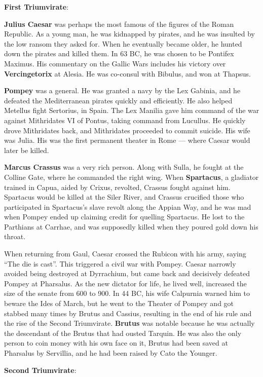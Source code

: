 \textbf{First Triumvirate}:

\textbf{Julius Caesar} was perhaps the most famous of the figures of the Roman Republic.
As a young man, he was kidnapped by pirates, and he was insulted by the low ransom they asked for.
When he eventually became older, he hunted down the pirates and killed them.
In 63 BC, he was chosen to be Pontifex Maximus.
His commentary on the Gallic Wars includes his victory over \textbf{Vercingetorix} at Alesia.
He was co-consul with Bibulus, and won at Thapsus.

\textbf{Pompey} was a general. He was granted a navy by the Lex Gabinia, and he defeated
the Mediterranean pirates quickly and efficiently.
He also helped Metellus fight Sertorius, in Spain.
The Lex Manilia gave him command of the war against Mithridates VI of Pontus, taking command from Lucullus.
He quickly drove Mithridates back, and Mithridates proceeded to commit suicide.
His wife was Julia.
His was the first permanent theater in Rome --- where Caesar would later be killed.

\textbf{Marcus Crassus} was a very rich person.
Along with Sulla, he fought at the Colline Gate, where he commanded the right wing.
When \textbf{Spartacus}, a gladiator trained in Capua, aided by Crixus, revolted, Crassus fought against him.
Spartacus would be killed at the Siler River, and
Crassus crucified those who participated in Spartacus's slave revolt along the Appian Way,
and he was mad when Pompey ended up claiming credit for quelling Spartacus.
He lost to the Parthians at Carrhae, and was supposedly killed when they poured gold down his throat.

When returning from Gaul, Caesar crossed the Rubicon with his army, saying ``The die is cast''.
This triggered a civil war with Pompey.
Caesar narrowly avoided being destroyed at Dyrrachium, but came back and decisively defeated Pompey at Pharsalus.
As the new dictator for life, he lived well, increased the size of the senate from 600 to 900.
In 44 BC, his wife Calpurnia warned him to beware the Ides of March,
but he went to the Theater of Pompey and got stabbed many times by Brutus and Cassius,
resulting in the end of his rule and the rise of the Second Triumvirate.
\textbf{Brutus} was notable because he was actually the descendant of the Brutus that had ousted Tarquin.
He was also the only person to coin money with his own face on it,
Brutus had been saved at Pharsalus by Servillia, and he had been raised by Cato the Younger.

\textbf{Second Triumvirate}:

